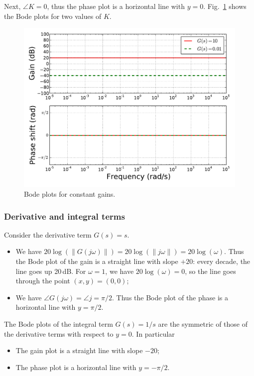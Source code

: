 \documentclass[a4paper,11pt]{report}
\theoremstyle{definition}
\begin{document}
Next, $\angle K=0$, thus the phase plot is a horizontal line with
$y=0$. Fig.~\ref{fig:bode-const} shows the Bode plots for two values
of $K$.

\begin{figure}[H]
  \centering
  \includegraphics[width=12cm]{fig/bode-const.pdf}
  \caption{Bode plots for constant gains.}
  \label{fig:bode-const}
\end{figure}

\subsubsection{Derivative and integral terms}

Consider the derivative term $G(s)=s$. 
\begin{itemize}
\item We have
  $20\log(\|G(j\omega)\|)=20\log(\|j\omega\|)=20\log(\omega)$. Thus
  the Bode plot of the gain is a straight line with slope $+20$: every
  decade, the line goes up 20\,dB. For $\omega=1$, we have
  $20\log(\omega)=0$, so the line goes through the point
  $(x,y)=(0,0)$;
\item We have $\angle G(j\omega)=\angle j=\pi/2$. Thus the Bode plot
  of the phase is a horizontal line with $y=\pi/2$.
\end{itemize}

The Bode plots of the integral term $G(s)=1/s$ are the symmetric of
those of the derivative terms with respect to $y=0$. In particular
\begin{itemize}
\item The gain plot is a straight line with slope $-20$;
\item The phase plot is a horizontal line with $y=-\pi/2$.
\end{itemize}
\end{document}
